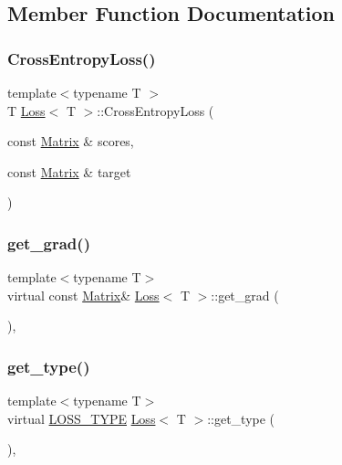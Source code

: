 \subsection{Member Function Documentation}
\mbox{\label{class_loss_ad9278bd08a8e63a856f317b58c73195b}} 
\subsubsection{\texorpdfstring{CrossEntropyLoss()}{CrossEntropyLoss()}}
{\footnotesize\ttfamily template$<$typename T $>$ \\
T \mbox{\hyperlink{class_loss}{Loss}}$<$ T $>$\+::Cross\+Entropy\+Loss (\begin{DoxyParamCaption}\item[{const \mbox{\hyperlink{class_loss_a0cb2ca4ba669a18f628d747a995cd26c}{Matrix}} \&}]{scores,  }\item[{const \mbox{\hyperlink{class_loss_a0cb2ca4ba669a18f628d747a995cd26c}{Matrix}} \&}]{target }\end{DoxyParamCaption})\hspace{0.3cm}{\ttfamily [virtual]}}

\mbox{\label{class_loss_a20cbb31f5e0bb747ba6f8ee6ba25648c}} 
\subsubsection{\texorpdfstring{get\_grad()}{get\_grad()}}
{\footnotesize\ttfamily template$<$typename T$>$ \\
virtual const \mbox{\hyperlink{class_loss_a0cb2ca4ba669a18f628d747a995cd26c}{Matrix}}\& \mbox{\hyperlink{class_loss}{Loss}}$<$ T $>$\+::get\+\_\+grad (\begin{DoxyParamCaption}{ }\end{DoxyParamCaption})\hspace{0.3cm}{\ttfamily [inline]}, {\ttfamily [virtual]}}

\mbox{\label{class_loss_a17a1565bd927d068dbb5f556874e7ae7}} 
\subsubsection{\texorpdfstring{get\_type()}{get\_type()}}
{\footnotesize\ttfamily template$<$typename T$>$ \\
virtual \mbox{\hyperlink{loss_8hpp_a72b6675b9bd68360ebc6e54006d8220f}{L\+O\+S\+S\+\_\+\+T\+Y\+PE}} \mbox{\hyperlink{class_loss}{Loss}}$<$ T $>$\+::get\+\_\+type (\begin{DoxyParamCaption}{ }\end{DoxyParamCaption})\hspace{0.3cm}{\ttfamily [inline]}, {\ttfamily [virtual]}}



